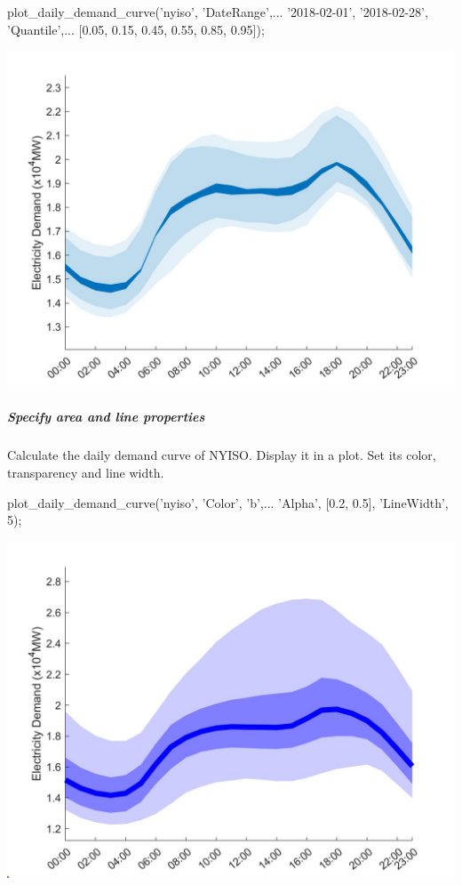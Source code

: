 \documentclass[11pt]{article}
\numberwithin{equation}{section}
\numberwithin{table}{section}
\numberwithin{figure}{section}
\begin{document}
\begin{Code}
  plot_daily_demand_curve('nyiso', 'DateRange',...
  {'2018-02-01', '2018-02-28'}, 'Quantile',...
  [0.05, 0.15, 0.45, 0.55, 0.85, 0.95]);
\end{Code}

\begin{center}
  \noindent\includegraphics[width=\textwidth]{figures/plot_daily_demand_curve_example2.jpg}
\end{center}



\subparagraph{Specify area and line properties}

Calculate the daily demand curve of NYISO. Display it in a plot. Set its color, transparency and line width.

\begin{Code}
  plot_daily_demand_curve('nyiso', 'Color', 'b',...
  'Alpha', [0.2, 0.5], 'LineWidth', 5);
\end{Code}

\begin{center}
  \noindent\includegraphics[width=\textwidth]{figures/plot_daily_demand_curve_example3.jpg}
\end{center}
\end{document}

